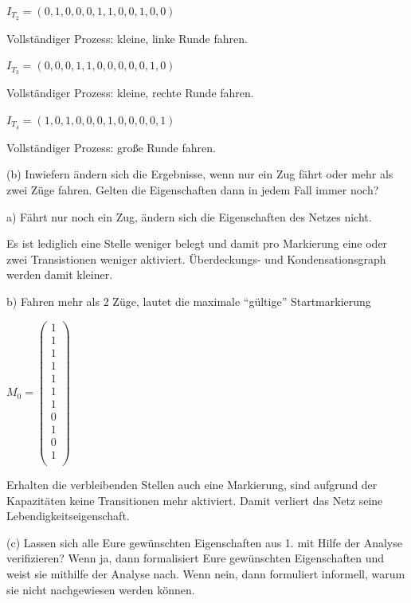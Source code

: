 \documentclass{scrreprt}
\begin{document}
\begin{enumerate}
$I_{T_2} = (0, 1, 0, 0, 0, 1, 1, 0, 0, 1, 0, 0)$

Vollständiger Prozess: kleine, linke Runde fahren.

$I_{T_3} = (0, 0, 0, 1, 1, 0, 0, 0, 0, 0, 1, 0)$

Vollständiger Prozess: kleine, rechte Runde fahren.

$I_{T_4} = (1, 0, 1, 0, 0, 0, 1, 0, 0, 0, 0, 1)$

Vollständiger Prozess: große Runde fahren.

(b) Inwiefern ändern sich die Ergebnisse, wenn nur ein Zug fährt oder mehr als zwei Züge fahren. Gelten die Eigenschaften dann in jedem Fall immer noch?

a) Fährt nur noch ein Zug, ändern sich die Eigenschaften des Netzes nicht. 

Es ist lediglich eine Stelle weniger belegt und damit pro Markierung eine oder zwei Transistionen weniger aktiviert. Überdeckungs- und Kondensationsgraph werden damit kleiner.


b) Fahren mehr als 2 Züge, lautet die maximale ``gültige'' Startmarkierung

\( M_0 = \begin{pmatrix}
1 \\ %
1 \\ %
1 \\ %
1 \\ %
1 \\ %
1 \\ %
1 \\ %
0 \\ %
1 \\ %
0 \\ %
1 \\ %
\end{pmatrix} \)

Erhalten die verbleibenden Stellen auch eine Markierung, sind aufgrund der Kapazitäten keine Transitionen mehr aktiviert. Damit verliert das Netz seine Lebendigkeitseigenschaft.


(c) Lassen sich alle Eure gewünschten Eigenschaften aus 1. mit Hilfe der Analyse verifizieren? Wenn ja, dann formalisiert Eure gewünschten Eigenschaften und weist sie mithilfe der Analyse nach. Wenn nein, dann formuliert informell, warum sie nicht nachgewiesen werden können.


\end{enumerate}
\end{document}
